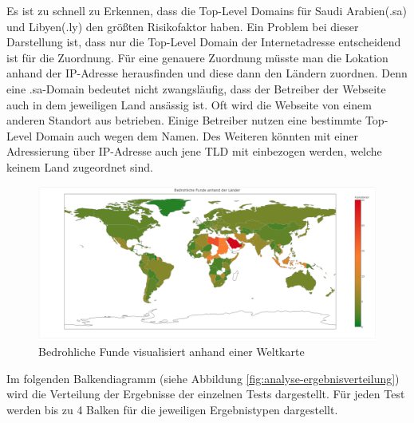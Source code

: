 Es ist zu schnell zu Erkennen, dass die Top-Level Domains für Saudi Arabien(.sa) und Libyen(.ly) den größten Risikofaktor haben. Ein Problem bei dieser Darstellung ist, dass nur die Top-Level Domain der Internetadresse entscheidend ist für die Zuordnung. Für eine genauere Zuordnung müsste man die Lokation anhand der IP-Adresse herausfinden und diese dann den Ländern zuordnen. Denn eine .sa-Domain bedeutet nicht zwangsläufig, dass der Betreiber der Webseite auch in dem jeweiligen Land ansässig ist. Oft wird die Webseite von einem anderen Standort aus betrieben. Einige Betreiber nutzen eine bestimmte Top-Level Domain auch wegen dem Namen. Des Weiteren könnten mit einer Adressierung über IP-Adresse auch jene \ac{TLD} mit einbezogen werden, welche keinem Land zugeordnet sind.

\begin{figure}[H]
  \centering
  \includegraphics[width=15cm]{images/stats/weltkarte}
  \caption[Bedrohliche Funde visualisiert anhand einer Weltkarte]{Bedrohliche Funde visualisiert anhand einer Weltkarte\protect\footnotemark}
  \label{fig:analyse-weltkarte}
\end{figure}

Im folgenden Balkendiagramm (siehe Abbildung \ref{fig:analyse-ergebnisverteilung}) wird die Verteilung der Ergebnisse der einzelnen Tests dargestellt. Für jeden Test werden bis zu 4 Balken für die jeweiligen Ergebnistypen dargestellt.

